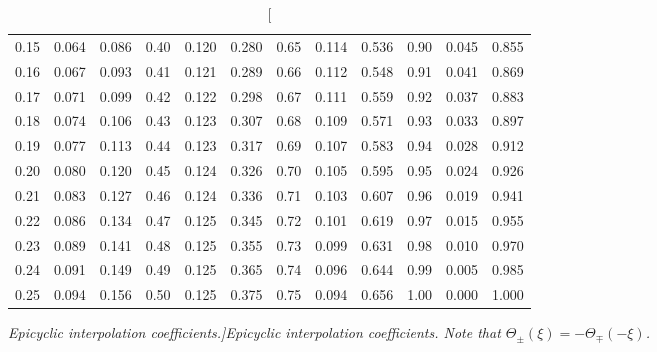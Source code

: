 \begin{table}
\begin{tabular}{ccc|ccc|ccc|ccc}
  0.15 &   0.064 &   0.086 &   0.40 &   0.120 &   0.280 &   0.65 &   0.114 &   0.536 &   0.90 &   0.045 &   0.855\\
  0.16 &   0.067 &   0.093 &   0.41 &   0.121 &   0.289 &   0.66 &   0.112 &   0.548 &   0.91 &   0.041 &   0.869\\
  0.17 &   0.071 &   0.099 &   0.42 &   0.122 &   0.298 &   0.67 &   0.111 &   0.559 &   0.92 &   0.037 &   0.883\\
  0.18 &   0.074 &   0.106 &   0.43 &   0.123 &   0.307 &   0.68 &   0.109 &   0.571 &   0.93 &   0.033 &   0.897\\
  0.19 &   0.077 &   0.113 &   0.44 &   0.123 &   0.317 &   0.69 &   0.107 &   0.583 &   0.94 &   0.028 &   0.912\\
  0.20 &   0.080 &   0.120 &   0.45 &   0.124 &   0.326 &   0.70 &   0.105 &   0.595 &   0.95 &   0.024 &   0.926\\
  0.21 &   0.083 &   0.127 &   0.46 &   0.124 &   0.336 &   0.71 &   0.103 &   0.607 &   0.96 &   0.019 &   0.941\\
  0.22 &   0.086 &   0.134 &   0.47 &   0.125 &   0.345 &   0.72 &   0.101 &   0.619 &   0.97 &   0.015 &   0.955\\
  0.23 &   0.089 &   0.141 &   0.48 &   0.125 &   0.355 &   0.73 &   0.099 &   0.631 &   0.98 &   0.010 &   0.970\\
  0.24 &   0.091 &   0.149 &   0.49 &   0.125 &   0.365 &   0.74 &   0.096 &   0.644 &   0.99 &   0.005 &   0.985\\
  0.25 &   0.094 &   0.156 &   0.50 &   0.125 &   0.375 &   0.75 &   0.094 &   0.656 &   1.00 &  0.000 &   1.000\\
\end{tabular}
\caption[\em  Epicyclic interpolation coefficients.]{\em Epicyclic interpolation coefficients. Note that $\Theta_\pm (\xi) = - \Theta_\mp (-\xi)$.}\label{vty}
\end{table}

